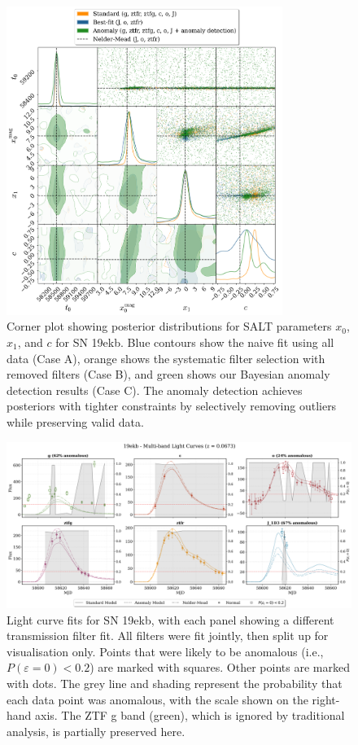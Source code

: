 \begin{figure}
\centering
\includegraphics[width=0.8\textwidth]{images/corner_comparison_19ekb_paper_quality.png}
\caption{Corner plot showing posterior distributions for SALT parameters $x_0$, $x_1$, and $c$ for SN 19ekb. Blue contours show the naive fit using all data (Case A), orange shows the systematic filter selection with removed filters (Case B), and green shows our Bayesian anomaly detection results (Case C). The anomaly detection achieves posteriors with tighter constraints by selectively removing outliers while preserving valid data.}
\label{fig:19ekb_corner}
\end{figure}

\begin{figure}
\centering
\includegraphics[width=\textwidth]{images/19ekb_light_curves_all_paper.png}
\caption{Light curve fits for SN 19ekb, with each panel showing a different transmission filter fit. All filters were fit jointly, then split up for visualisation only. Points that were likely to be anomalous (i.e., $P(\varepsilon=0) < 0.2$) are marked with squares. Other points are marked with dots. The grey line and shading represent the probability that each data point was anomalous, with the scale shown on the right-hand axis. The ZTF g band (green), which is ignored by traditional analysis, is partially preserved here.}
\label{fig:19ekb_lightcurves}
\end{figure}

